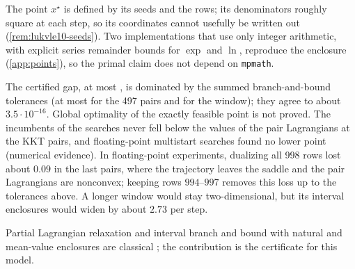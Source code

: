 The point $x^\star$ is defined by its seeds and the rows; its denominators roughly square at each step, so its coordinates cannot usefully be written out (\cref{rem:lukvle10-seeds}).
Two implementations that use only integer arithmetic, with explicit series remainder bounds for $\exp$ and $\ln$, reproduce the enclosure (\cref{app:points}), so the primal claim does not depend on \texttt{mpmath}.

\begin{remark}\label{rem:lukvle10-gap}
The certified gap, at most , is dominated by the summed branch-and-bound tolerances (at most  for the 497 pairs and  for the window); they agree to about $3.5\cdot10^{-16}$.
Global optimality of the exactly feasible point is not proved.
The incumbents of the searches never fell below the values of the pair Lagrangians at the KKT pairs, and floating-point multistart searches found no lower point (numerical evidence).
In floating-point experiments, dualizing all 998 rows lost about $0.09$ in the last pairs, where the trajectory leaves the saddle and the pair Lagrangians are nonconvex; keeping rows $994$--$997$ removes this loss up to the tolerances above.
A longer window would stay two-dimensional, but its interval enclosures would widen by about $2.73$ per step.
\end{remark}

Partial Lagrangian relaxation and interval branch and bound with natural and mean-value enclosures are classical \citep{neumaier2004-complete-search-in-continuous-global}; the contribution is the certificate for this model.

\begin{certbox}
\end{certbox}
